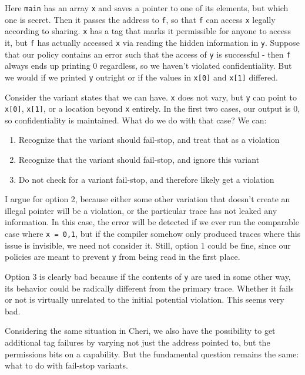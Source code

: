 \documentclass{article}
\begin{document}
Here {\tt main} has an array {\tt x} and saves a pointer to one of its elements, but which one is secret.
Then it passes the address to  {\tt f}, so that {\tt f} can access {\tt x} legally according to sharing.
{\tt x} has a tag that marks it permissible for anyone to access it, but {\tt f} has actually accessed {\tt x}
via reading the hidden information in {\tt y}. Suppose that our policy contains an error such that the access
of {\tt y} is successful - then {\tt f} always ends up printing 0 regardless, so we haven't violated
confidentiality. But we would if we printed {\tt y} outright or if the values in {\tt x[0]} and
{\tt x[1]} differed.

Consider the variant states that we can have. {\tt x} does not vary, but {\tt y} can point to {\tt x[0]},
{\tt x[1]}, or a location beyond {\tt x} entirely. In the first two cases, our output is 0,
so confidentiality is maintained. What do we do with that case? We can:

\begin{enumerate}
\item Recognize that the variant should fail-stop, and treat that as a violation
\item Recognize that the variant should fail-stop, and ignore this variant
\item Do not check for a variant fail-stop, and therefore likely get a violation
\end{enumerate}

I argue for option 2, because either some other variation that doesn't create an illegal pointer
will be a violation, or the particular trace has not leaked any information. In this case,
the error will be detected if we ever run the comparable case where {\tt x = {0,1}}, but if the compiler
somehow only produced traces where this issue is invisible, we need not consider it. Still, option 1
could be fine, since our policies are meant to prevent {\tt y} from being read in the first place.

Option 3 is clearly bad because if the contents of {\tt y} are used in some other way, its behavior
could be radically different from the primary trace. Whether it fails or not is virtually unrelated to
the initial potential violation. This seems very bad.

Considering the same situation in Cheri, we also have the possibility to get additional tag failures
by varying not just the address pointed to, but the permissions bits on a capability. But the fundamental
question remains the same: what to do with fail-stop variants.
\end{document}
